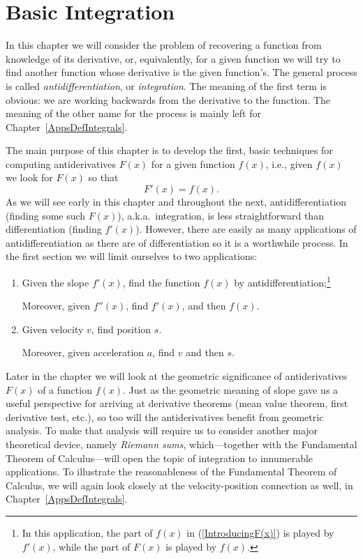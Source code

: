 \chapter{Basic Integration\label{FirstIntegrationChapter}}

In this chapter we will consider the problem of recovering 
a function from knowledge of its derivative, or, equivalently,
for a given function we will try to find another function
whose derivative is the given function's.  The general process
is called  {\it antidifferentiation}, or
{\it integration}.  The meaning of the first term is obvious:
we are working backwards from the  derivative to the function.
The meaning of the other name for the process
is mainly left for Chapter~\ref{AppsDefIntegrals}.

The main purpose of this chapter is to develop the first, basic
techniques for computing antiderivatives $F(x)$ for a given
function $f(x)$, i.e., given $f(x)$ we look for $F(x)$ so that
\begin{equation}
F'(x)=f(x).\label{IntroducingF(x)}\end{equation}
As we will see early in this chapter and throughout the next, 
antidifferentiation (finding some such $F(x)$), a.k.a.\ integration,
is less straightforward than differentiation (finding $f'(x)$).  
However, there are easily as many applications of antidifferentiation 
as there are of differentiation so it is a worthwhile process.  
In the first section we will limit ourselves to two applications:
\begin{enumerate}
\item Given the slope $f'(x)$, find the function $f(x)$
      by antidifferentiation;\footnote{%
In this application, the part of $f(x)$ in (\ref{IntroducingF(x)})
is played by $f'(x)$, while the part of $F(x)$ is played by $f(x)$.}

      Moreover, given $f''(x)$, find $f'(x)$, and then $f(x)$.
\item Given velocity $v$, find position $s$. 

      Moreover, given
      acceleration $a$, find $v$ and then $s$.
\end{enumerate}
Later in the chapter
we will look at the geometric
significance of antiderivatives $F(x)$ of a function $f(x)$.  
Just as the geometric meaning of 
slope gave us a useful perspective for arriving at derivative theorems
(mean value theorem, first derivative test, etc.), so too will the
antiderivatives benefit from geometric analysis.  To make
that analysis will require us to consider another major theoretical device,
namely {\it Riemann sums}, which---together with the 
Fundamental Theorem of Calculus---will open the topic of integration
to innumerable applications.  To illustrate the reasonableness of
the Fundamental Theorem of Calculus, we will again look closely at the
velocity-position connection as well, in
Chapter~\ref{AppsDefIntegrals}.


